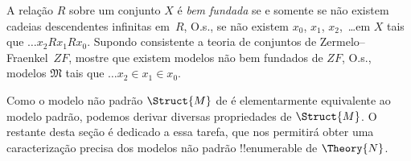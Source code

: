 \documentclass[../../../include/open-logic-section]{subfiles}
\begin{document}
\begin{prob}
A relação $R$ sobre um conjunto $X$ é \emph{bem fundada} se e somente se
não existem cadeias descendentes infinitas em~$R$, O.s.\@, se não existem
$x_0$, $x_1$, $x_2$,~\dots em $X$ tais que $\dots x_2Rx_1Rx_0$. Supondo
consistente a teoria de conjuntos de Zermelo--Fraenkel~$ZF$, mostre que existem
modelos não bem fundados de $ZF$, O.s.\@, modelos $\mathfrak{M}$ tais que
$\dots x_2 \in x_1 \in x_0$.
\end{prob}

Como o modelo não padrão $\Struct{M}$ de  é
elementarmente equivalente ao modelo padrão, podemos derivar diversas propriedades de
$\Struct{M}$. O restante desta seção é dedicado a
essa tarefa, que nos permitirá obter uma caracterização precisa
dos modelos não padrão !!{enumerable} de $\Theory{N}$.
\end{document}
